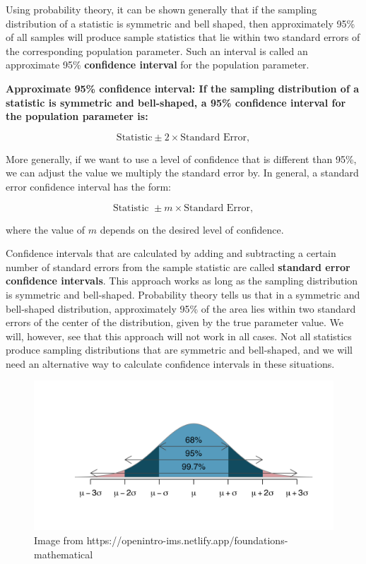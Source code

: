 \documentclass[
  letterpaper,
  DIV=11,
  numbers=noendperiod]{scrreprt}
\begin{document}
Using probability theory, it can be shown generally that if the sampling
distribution of a statistic is symmetric and bell shaped, then
approximately 95\% of all samples will produce sample statistics that
lie within two standard errors of the corresponding population
parameter. Such an interval is called an approximate 95\%
\textbf{confidence interval} for the population parameter.

\textbf{Approximate 95\% confidence interval: If the sampling
distribution of a statistic is symmetric and bell-shaped, a 95\%
confidence interval for the population parameter is:}

\[
\text{Statistic} \pm 2\times \text{Standard Error}, 
\]

More generally, if we want to use a level of confidence that is
different than 95\%, we can adjust the value we multiply the standard
error by. In general, a standard error confidence interval has the form:

\[
\text{Statistic } \pm m\times \text{Standard Error}, 
\]

where the value of \(m\) depends on the desired level of confidence.

Confidence intervals that are calculated by adding and subtracting a
certain number of standard errors from the sample statistic are called
\textbf{standard error confidence intervals}. This approach works as
long as the sampling distribution is symmetric and bell-shaped.
Probability theory tells us that in a symmetric and bell-shaped
distribution, approximately 95\% of the area lies within two standard
errors of the center of the distribution, given by the true parameter
value. We will, however, see that this approach will not work in all
cases. Not all statistics produce sampling distributions that are
symmetric and bell-shaped, and we will need an alternative way to
calculate confidence intervals in these situations.

\begin{figure}[H]

{\centering \includegraphics{Emp_Rule.png}

}

\caption{Image from
https://openintro-ims.netlify.app/foundations-mathematical}

\end{figure}%
\end{document}
